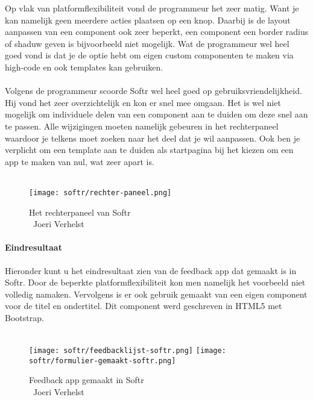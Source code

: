 Op vlak van platformflexibiliteit vond de programmeur het zeer matig. 
Want je kan namelijk geen meerdere acties plaatsen op een knop. 
Daarbij is de layout aanpassen van een component ook zeer beperkt, een component een border radius of shaduw geven is bijvoorbeeld niet mogelijk. 
Wat de programmeur wel heel goed vond is dat je de optie hebt om eigen custom componenten te maken via high-code en ook templates kan gebruiken.
\\
\\
Volgens de programmeur scoorde Softr wel heel goed op gebruiksvriendelijkheid. 
Hij vond het zeer overzichtelijk en kon er snel mee omgaan. 
Het is wel niet mogelijk om individuele delen van een component aan te duiden om deze snel aan te passen. 
Alle wijzigingen moeten namelijk gebeuren in het rechterpaneel waardoor je telkens moet zoeken naar het deel dat je wil aanpassen. 
Ook ben je verplicht om een template aan te duiden als startpagina bij het kiezen om een app te maken van nul, wat zeer apart is. 
\\
\\
\begin{figure}[H]
    \texttt{[image: softr/rechter-paneel.png]}
    \caption[Het rechterpaneel van Softr]{Het rechterpaneel van Softr\\\textcopyright\ Joeri Verhelst}
    \label{fig:softr-rechterpaneel}
\end{figure}
\paragraph*{Eindresultaat}
Hieronder kunt u het eindresultaat zien van de feedback app dat gemaakt is in Softr. Door de beperkte platformflexibiliteit kon men namelijk het voorbeeld niet volledig namaken. 
Vervolgens is er ook gebruik gemaakt van een eigen component voor de titel en ondertitel. Dit component werd geschreven in HTML5 met Bootstrap.
\\
\\

\begin{figure}[H]
    \texttt{[image: softr/feedbacklijst-softr.png]}
    \texttt{[image: softr/formulier-gemaakt-softr.png]}
    \caption[Feedback app gemaakt in Softr]{Feedback app gemaakt in Softr\\\textcopyright\ Joeri Verhelst}
    \label{fig:softr-feedback-app}
\end{figure}

